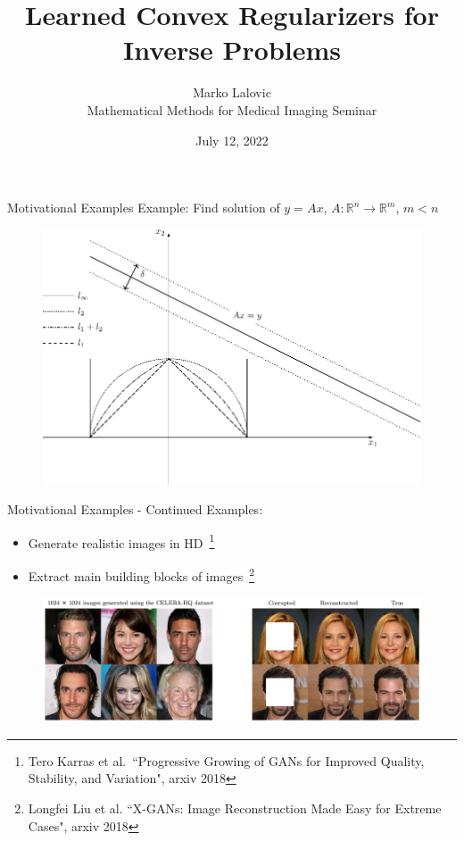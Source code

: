 \documentclass{beamer}
\title[Learned Convex Regularizers]{Learned Convex Regularizers for Inverse Problems}
\author{Marko Lalovic \\[.5em]
Mathematical Methods for Medical Imaging Seminar}
\date{July 12, 2022}
\begin{document}
\begin{frame}
    \titlepage 
\end{frame}

\begin{frame}{Motivational Examples}
Example: Find solution of $y = Ax$, $A: \mathbb{R}^{n} \rightarrow \mathbb{R}^{m}$, $m < n$
\begin{center}
\begin{figure}
\includegraphics[width=.99\textwidth]{../figures/norms-crop.pdf}
\end{figure}
\end{center}
\end{frame}

\begin{frame}{Motivational Examples - Continued}
Examples:
\begin{itemize}
\item Generate realistic images in HD~\footnote{{\tiny \color{blue} Tero Karras et al.\ ``Progressive Growing of GANs for Improved Quality, Stability, and Variation", arxiv 2018}}
\item Extract main building blocks of images~\footnote{{\tiny \color{blue} Longfei Liu et al. ``X-GANs: Image Reconstruction Made Easy for Extreme Cases", arxiv 2018}}
\end{itemize}
\begin{center}
\begin{figure}
\includegraphics[width=\textwidth]{../figures/output.pdf}
\end{figure}
\end{center}
\end{frame}
\end{document}
